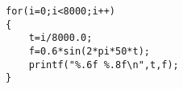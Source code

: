 \lipsum


\begin{lstlisting}
for(i=0;i<8000;i++)
{
    t=i/8000.0;
    f=0.6*sin(2*pi*50*t);
    printf("%.6f %.8f\n",t,f);
}
\end{lstlisting}


